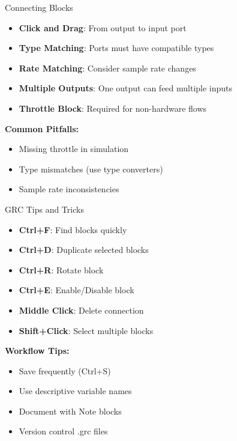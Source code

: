\documentclass[aspectratio=169,11pt]{beamer}
\begin{document}
\begin{frame}{Connecting Blocks}
\begin{itemize}
    \item \textbf{Click and Drag}: From output to input port
    \item \textbf{Type Matching}: Ports must have compatible types
    \item \textbf{Rate Matching}: Consider sample rate changes
    \item \textbf{Multiple Outputs}: One output can feed multiple inputs
    \item \textbf{Throttle Block}: Required for non-hardware flows
\end{itemize}

\textbf{Common Pitfalls:}
\begin{itemize}
    \item Missing throttle in simulation
    \item Type mismatches (use type converters)
    \item Sample rate inconsistencies
\end{itemize}
\end{frame}

\begin{frame}{GRC Tips and Tricks}
\begin{itemize}
    \item \textbf{Ctrl+F}: Find blocks quickly
    \item \textbf{Ctrl+D}: Duplicate selected blocks
    \item \textbf{Ctrl+R}: Rotate block
    \item \textbf{Ctrl+E}: Enable/Disable block
    \item \textbf{Middle Click}: Delete connection
    \item \textbf{Shift+Click}: Select multiple blocks
\end{itemize}

\textbf{Workflow Tips:}
\begin{itemize}
    \item Save frequently (Ctrl+S)
    \item Use descriptive variable names
    \item Document with Note blocks
    \item Version control .grc files
\end{itemize}
\end{frame}
\end{document}
